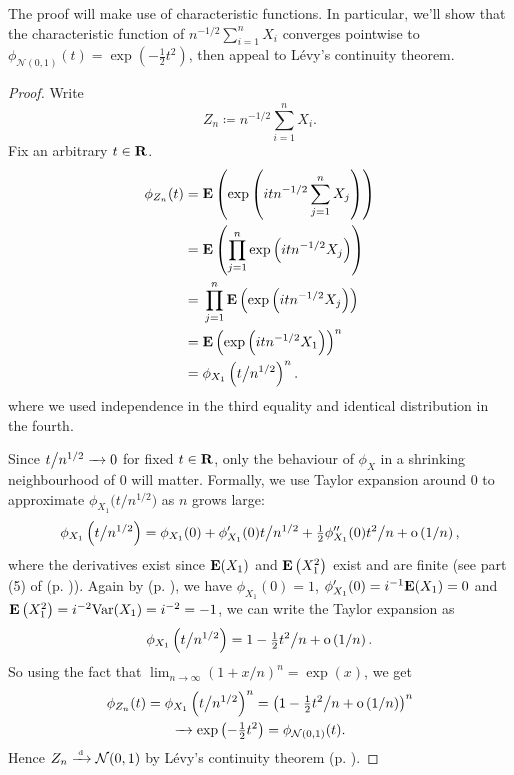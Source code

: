 \documentclass[11pt,letterpaper,reqno,oneside]{article}
\begin{document}
The proof will make use of characteristic functions. In particular, we'll show that the characteristic function of $n^{-1/2} \sum_{i=1}^n X_i$ converges pointwise to $\phi_{\mathcal{N}(0,1)}(t) = \exp\left( -\tfrac{1}{2} t^2 \right)$, then appeal to Lévy's continuity theorem.
%
\begin{proof}
	Write
	\begin{equation*}
		Z_n \coloneqq n^{-1/2} \sum_{i=1}^n X_i .
	\end{equation*}
	Fix an arbitrary $t \in \mathbf{R}$.
	\begin{align*}
		\phi_{Z_n}(t)
		={}& \mathbf{E}\left( \exp\left( i t n^{-1/2} \sum_{j=1}^n X_j \right) \right)
		\\
		={}& \mathbf{E}\left( \prod_{j=1}^n \exp\left( i t n^{-1/2} X_j \right) \right)
		\\
		={}& \prod_{j=1}^n \mathbf{E}\left( \exp\left( i t n^{-1/2} X_j \right) \right)
		\\
		={}& \mathbf{E}\left( \exp\left( i t n^{-1/2} X_1 \right) \right)^n 
		\\
		={}& \phi_{X_1}\left( t \big/ n^{1/2} \right)^n .
	\end{align*}
	where we used independence in the third equality and identical distribution in the fourth.

	Since $t \big/ n^{1/2} \xrightarrow{\;\;\;} 0$ for fixed $t \in \mathbf{R}$, only the behaviour of $\phi_X$ in a shrinking neighbourhood of $0$ will matter. Formally, we use Taylor expansion around $0$ to approximate $\phi_{X_1}\bigl( t \big/ n^{1/2} \bigr)$ as $n$ grows large:
	\begin{equation*}
		\phi_{X_1}\left( t \big/ n^{1/2} \right) 
		= \phi_{X_1}(0) + \phi_{X_1}'(0) t \big/ n^{1/2}
		+ \tfrac{1}{2} \phi_{X_1}''(0) t^2 \big/ n
		+ \mathrm{o}\left( 1/n \right) ,
	\end{equation*}
	where the derivatives exist since $\mathbf{E}(X_1)$ and $\mathbf{E}\left( X_1^2 \right)$ exist and are finite (see part (5) of  (p. \pageref{proposition:characteristic_fn_properties})). Again by  (p. \pageref{proposition:characteristic_fn_properties}), we have $\phi_{X_1}(0)=1$, $\phi_{X_1}'(0) = i^{-1} \mathbf{E}(X_1) = 0$ and $\mathbf{E}\left( X_1^2 \right)=i^{-2}\mathrm{Var}(X_1)=i^{-2} = -1$, we can write the Taylor expansion as
	\begin{equation*}
		\phi_{X_1}\left( t \big/ n^{1/2} \right)
		= 1 - \tfrac{1}{2} t^2 \big/ n 
		+ \mathrm{o}\left( 1/n \right) .
	\end{equation*}
	So using the fact that $\lim_{n\to\infty}\left( 1 + x/n \right)^n = \exp(x)$, we get
	\begin{multline*}
		\phi_{Z_n}(t)
		= \phi_{X_1}\left( t \big/ n^{1/2} \right)^n
		= \left( 1 - \tfrac{1}{2} t^2 \big/ n 
		+ \mathrm{o}\left( 1/n \right) \right)^n 
		\\
		\xrightarrow{\;\;\;} \exp\left( - \tfrac{1}{2} t^2 \right)
		= \phi_{\mathcal{N}(0,1)}(t) .
	\end{multline*}
	Hence $Z_n \xrightarrow{{\scriptscriptstyle \mathrm{\;d\;}}} \mathcal{N}(0,1)$ by Lévy's continuity theorem (p. \pageref{theorem:Levys_continuity_theorem}).
\end{proof}
\end{document}
